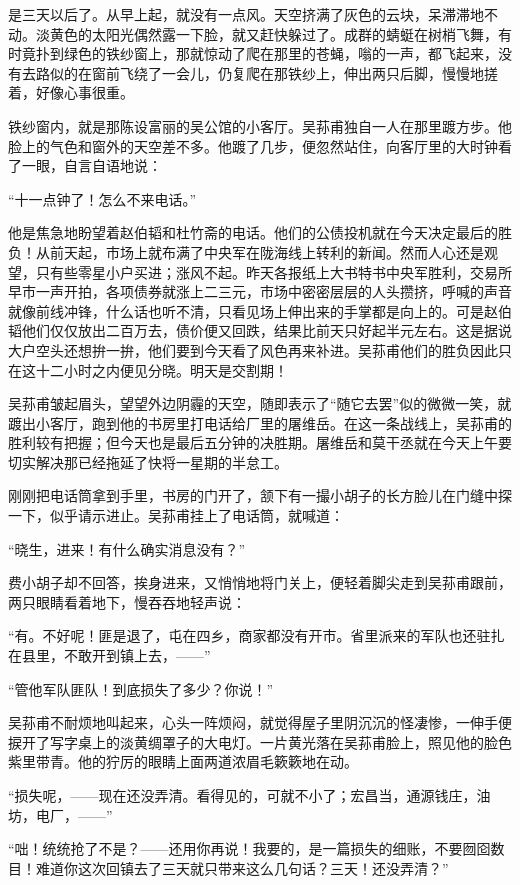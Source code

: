 \par 是三天以后了。从早上起，就没有一点风。天空挤满了灰色的云块，呆滞滞地不动。淡黄色的太阳光偶然露一下脸，就又赶快躲过了。成群的蜻蜓在树梢飞舞，有时竟扑到绿色的铁纱窗上，那就惊动了爬在那里的苍蝇，嗡的一声，都飞起来，没有去路似的在窗前飞绕了一会儿，仍复爬在那铁纱上，伸出两只后脚，慢慢地搓着，好像心事很重。
\par 铁纱窗内，就是那陈设富丽的吴公馆的小客厅。吴荪甫独自一人在那里踱方步。他脸上的气色和窗外的天空差不多。他踱了几步，便忽然站住，向客厅里的大时钟看了一眼，自言自语地说：
\par “十一点钟了！怎么不来电话。”
\par 他是焦急地盼望着赵伯韬和杜竹斋的电话。他们的公债投机就在今天决定最后的胜负！从前天起，市场上就布满了中央军在陇海线上转利的新闻。然而人心还是观望，只有些零星小户买进；涨风不起。昨天各报纸上大书特书中央军胜利，交易所早市一声开拍，各项债券就涨上二三元，市场中密密层层的人头攒挤，呼喊的声音就像前线冲锋，什么话也听不清，只看见场上伸出来的手掌都是向上的。可是赵伯韬他们仅仅放出二百万去，债价便又回跌，结果比前天只好起半元左右。这是据说大户空头还想拚一拚，他们要到今天看了风色再来补进。吴荪甫他们的胜负因此只在这十二小时之内便见分晓。明天是交割期！
\par 吴荪甫皱起眉头，望望外边阴霾的天空，随即表示了“随它去罢”似的微微一笑，就踱出小客厅，跑到他的书房里打电话给厂里的屠维岳。在这一条战线上，吴荪甫的胜利较有把握；但今天也是最后五分钟的决胜期。屠维岳和莫干丞就在今天上午要切实解决那已经拖延了快将一星期的半怠工。
\par 刚刚把电话筒拿到手里，书房的门开了，颔下有一撮小胡子的长方脸儿在门缝中探一下，似乎请示进止。吴荪甫挂上了电话筒，就喊道：
\par “晓生，进来！有什么确实消息没有？”
\par 费小胡子却不回答，挨身进来，又悄悄地将门关上，便轻着脚尖走到吴荪甫跟前，两只眼睛看着地下，慢吞吞地轻声说：
\par “有。不好呢！匪是退了，屯在四乡，商家都没有开市。省里派来的军队也还驻扎在县里，不敢开到镇上去，——”
\par “管他军队匪队！到底损失了多少？你说！”
\par 吴荪甫不耐烦地叫起来，心头一阵烦闷，就觉得屋子里阴沉沉的怪凄惨，一伸手便捩开了写字桌上的淡黄绸罩子的大电灯。一片黄光落在吴荪甫脸上，照见他的脸色紫里带青。他的狞厉的眼睛上面两道浓眉毛簌簌地在动。
\par “损失呢，——现在还没弄清。看得见的，可就不小了；宏昌当，通源钱庄，油坊，电厂，——”
\par “咄！统统抢了不是？——还用你再说！我要的，是一篇损失的细账，不要囫囵数目！难道你这次回镇去了三天就只带来这么几句话？三天！还没弄清？”
